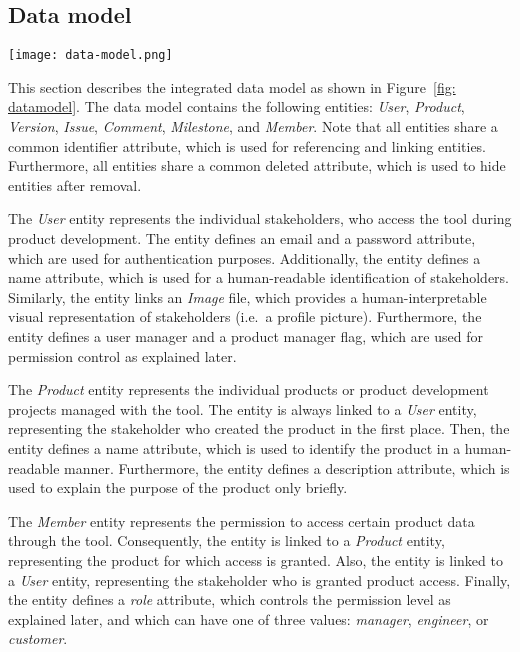 \subsection{Data model}

\begin{figure*}[ht]
    \centering
    \texttt{[image: data-model.png]}
    \caption{Integrated data model for improved information exchange between customers, project managers, requirements engineers, and product designers}
    \label{fig: datamodel}
\end{figure*}

This section describes the integrated data model as shown in Figure~\ref{fig: datamodel}.
The data model contains the following entities: \textit{User}, \textit{Product}, \textit{Version}, \textit{Issue}, \textit{Comment}, \textit{Milestone}, and \textit{Member}.
Note that all entities share a common identifier attribute, which is used for referencing and linking entities.
Furthermore, all entities share a common deleted attribute, which is used to hide entities after removal.

The \textit{User} entity represents the individual stakeholders, who access the tool during product development.
The entity defines an email and a password attribute, which are used for authentication purposes.
Additionally, the entity defines a name attribute, which is used for a human-readable identification of stakeholders.
Similarly, the entity links an \textit{Image} file, which provides a human-interpretable visual representation of stakeholders (i.e.\ a profile picture).
Furthermore, the entity defines a user manager and a product manager flag, which are used for permission control as explained later.

The \textit{Product} entity represents the individual products or product development projects managed with the tool.
The entity is always linked to a \textit{User} entity, representing the stakeholder who created the product in the first place.
Then, the entity defines a name attribute, which is used to identify the product in a human-readable manner.
Furthermore, the entity defines a description attribute, which is used to explain the purpose of the product only briefly.

The \textit{Member} entity represents the permission to access certain product data through the tool.
Consequently, the entity is linked to a \textit{Product} entity, representing the product for which access is granted.
Also, the entity is linked to a \textit{User} entity, representing the stakeholder who is granted product access.
Finally, the entity defines a \textit{role} attribute, which controls the permission level as explained later, and which can have one of three values: \textit{manager}, \textit{engineer}, or \textit{customer}.

